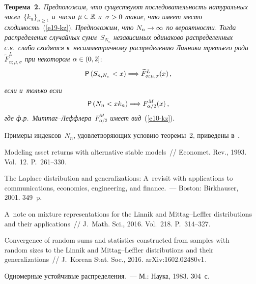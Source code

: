 \begin{multicols}{2}
\smallskip

\noindent
\textbf{Теорема~2.}\ \textit{Предположим, что существуют последовательность
натуральных чисел~$\{k_n\}_{n\geqslant1}$ и~числа $\mu\hm\in\mathbb{R}$ 
и~$\sigma\hm>0$ такие, что имеет место сходимость}~(\ref{e19-kz}). \textit{Предположим,
что $N_n\hm\to\infty$ по вероятности. Тогда распределения случайных
сумм~$S_{N_n}$ независимых одинаково распределенных с.в.\ слабо
сходятся к~несимметричному распределению Линника третьего рода
$\widetilde F^{L}_{\alpha;\mu,\sigma}$ при некотором}
$\alpha\hm\in(0,2]$:
$$
{\sf P}\left(S_{n,N_n}<x\right)\Longrightarrow \widetilde
F^{L}_{\alpha;\mu,\sigma}(x)\,,
$$

\noindent
\textit{если и~только если}
$$
{\sf P}\left(N_n<xk_n\right)\Longrightarrow F^{M}_{\alpha/2}(x)\,,
$$
\textit{где ф.р.\ Мит\-таг--Леф\-фле\-ра~$F^{M}_{\alpha/2}$ имеет вид}~(\ref{e10-kz}).

\vspace*{3pt}

Примеры индексов~$N_n$, удовлетворяющих условию теоремы~2, приведены
в~\cite{KorolevZeifman2016b}.

\vspace*{-12pt}


{\small\frenchspacing
 {%
 \begin{thebibliography}{99}
 Modeling asset returns with alternative stable models~// 
Economet. Rev., 1993. Vol.~12. P.~261--330.

The Laplace distribution and generalizations: A~revisit with 
applications to communications, economics, engineering, and finance.~--- 
Boston: Birkhauser, 2001. 349~p.

A~note on mixture representations for the Linnik and Mittag--Leffler 
distributions and their applications~// J.~Math. Sci., 2016. Vol.~218. P.~314--327.

Convergence of random sums and statistics constructed from samples with random sizes to the Linnik 
and Mittag--Leffler distributions and their generalizations~// 
J.~Korean Stat. Soc., 2016.  
arXiv:1602.02480v1.

 Одномерные устойчивые распределения.~--- М.: Наука, 1983.
304~с.


\end{thebibliography}}}
\end{multicols}
